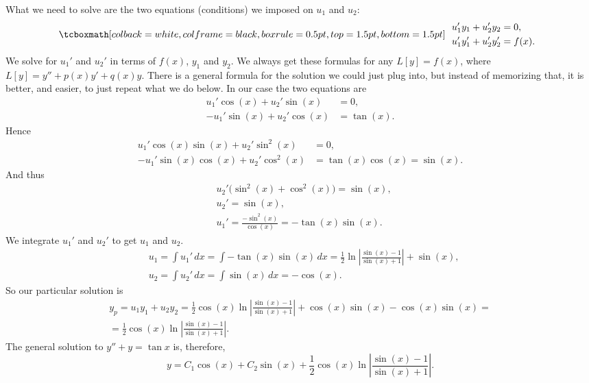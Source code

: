 What we need to solve are the two equations (conditions) we imposed
on $u_1$ and $u_2$:
\begin{equation*}
\mybxbg{~~
\begin{aligned}
& u_1' y_1 + u_2' y_2 = 0 ,\\
& u_1' y_1' + u_2' y_2' = f(x) .
\end{aligned}
~~}
\end{equation*}
We solve for $u_1'$ and $u_2'$ in terms of $f(x)$, $y_1$ and $y_2$.
We always get these formulas for any $L[y] = f(x)$, where $L[y] =
y''+p(x)y'+q(x)y$.  There is a general
formula for the solution we could just plug into, but instead of memorizing
that, it is better, and easier, to
just repeat what we do below.  In our case the two equations are
\begin{align*}
u_1' \cos (x) + u_2' \sin (x) &= 0 ,\\
-u_1' \sin (x) + u_2' \cos (x) &= \tan (x) .
\end{align*}
Hence
\begin{align*}
u_1' \cos (x) \sin (x) + u_2' \sin^2 (x) & = 0 ,\\
-u_1' \sin (x) \cos (x) + u_2' \cos^2 (x) & = \tan (x) \cos (x) = \sin (x) .
\end{align*}
And thus
\begin{align*}
& u_2' \bigl(\sin^2 (x) + \cos^2 (x)\bigr) = \sin (x) , \\
& u_2' = \sin (x) , \\
& u_1' = \frac{- \sin^2 (x)}{\cos (x)} = - \tan (x) \sin (x) .
\end{align*}
We integrate $u_1'$ and $u_2'$ to get $u_1$ and $u_2$.
\begin{align*}
& u_1 = \int u_1'\,dx 
= \int - \tan (x) \sin (x)\,dx
= \frac{1}{2}
\ln \left\lvert \frac{\sin (x)-1}{\sin (x) + 1} \right\rvert
+ \sin (x) , \\
& u_2 = \int u_2'\,dx 
= \int \sin (x)\,dx = -\cos (x) .
\end{align*}
So our particular solution is
\begin{multline*}
y_p = u_1 y_1 + u_2 y_2 =
\frac{1}{2} \cos (x) \ln \left\lvert \frac{\sin (x)-1}{\sin (x) + 1}
\right\rvert
+ \cos (x) \sin (x)
-\cos (x) \sin (x)
= \\ =
\frac{1}{2} \cos (x) \ln \left\lvert \frac{\sin (x)-1}{\sin (x) + 1}
\right\rvert .
\end{multline*}
The general solution to $y'' + y = \tan x$ is, therefore,
\begin{equation*}
y = C_1 \cos (x) + C_2 \sin (x) +
\frac{1}{2} \cos (x) \ln \left\lvert \frac{\sin (x)-1}{\sin (x) + 1}
\right\rvert .
\end{equation*}

